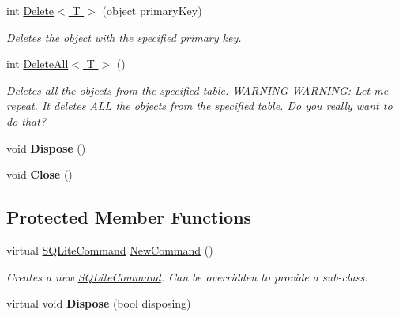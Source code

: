 \begin{DoxyCompactItemize}
int \hyperlink{classSQLite_1_1SQLiteConnection_a0d4046198236b8c96b0bf50593f592a6}{Delete$<$ T $>$} (object primary\+Key)
\begin{DoxyCompactList}\small\item\em Deletes the object with the specified primary key. \end{DoxyCompactList}\item 
int \hyperlink{classSQLite_1_1SQLiteConnection_abed406a2cd17e1e360b79924a749b67c}{Delete\+All$<$ T $>$} ()
\begin{DoxyCompactList}\small\item\em Deletes all the objects from the specified table. W\+A\+R\+N\+I\+N\+G W\+A\+R\+N\+I\+N\+G\+: Let me repeat. It deletes A\+L\+L the objects from the specified table. Do you really want to do that? \end{DoxyCompactList}\item 
\hypertarget{classSQLite_1_1SQLiteConnection_ad9e1e281245e83dbe9c5303eaefe95f6}{}void {\bfseries Dispose} ()\label{classSQLite_1_1SQLiteConnection_ad9e1e281245e83dbe9c5303eaefe95f6}

\item 
\hypertarget{classSQLite_1_1SQLiteConnection_a74160304a4a218b7508220106eeb10d0}{}void {\bfseries Close} ()\label{classSQLite_1_1SQLiteConnection_a74160304a4a218b7508220106eeb10d0}

\end{DoxyCompactItemize}
\subsection*{Protected Member Functions}
\begin{DoxyCompactItemize}
\item 
virtual \hyperlink{classSQLite_1_1SQLiteCommand}{S\+Q\+Lite\+Command} \hyperlink{classSQLite_1_1SQLiteConnection_a7535db6cca83fcde078fa4340b32e982}{New\+Command} ()
\begin{DoxyCompactList}\small\item\em Creates a new \hyperlink{classSQLite_1_1SQLiteCommand}{S\+Q\+Lite\+Command}. Can be overridden to provide a sub-\/class. \end{DoxyCompactList}\item 
\hypertarget{classSQLite_1_1SQLiteConnection_ab5e33e84b34867c48d1578d2890ff7e7}{}virtual void {\bfseries Dispose} (bool disposing)\label{classSQLite_1_1SQLiteConnection_ab5e33e84b34867c48d1578d2890ff7e7}

\end{DoxyCompactItemize}
